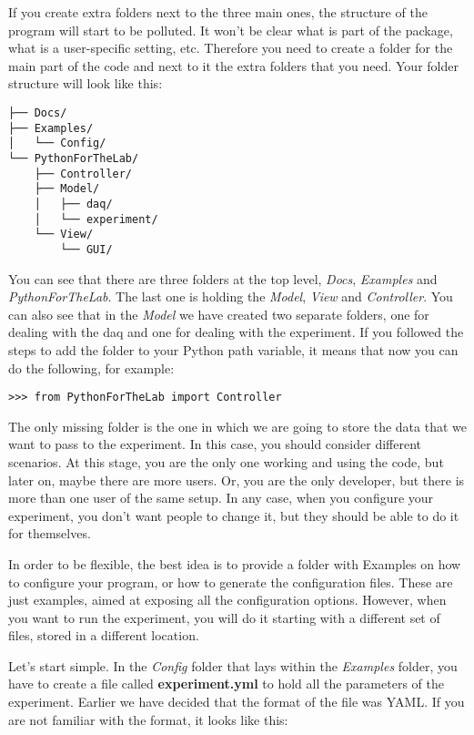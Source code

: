 If you create extra folders next to the three main ones, the structure
of the program will start to be polluted. It won't be clear what is part
of the package, what is a user-specific setting, etc. Therefore you need
to create a folder for the main part of the code and next to it the
extra folders that you need. Your folder structure will look like this:

\begin{verbatim}
├── Docs/
├── Examples/
│   └── Config/
└── PythonForTheLab/
    ├── Controller/
    ├── Model/
    │   ├── daq/
    │   └── experiment/
    └── View/
        └── GUI/
\end{verbatim}

You can see that there are three folders at the top level, \emph{Docs},
\emph{Examples} and \emph{PythonForTheLab}. The last one is holding the
\emph{Model}, \emph{View} and \emph{Controller}. You can also see that
in the \emph{Model} we have created two separate folders, one for
dealing with the daq and one for dealing with the experiment. If you
followed the steps to add the folder to your Python path variable, it
means that now you can do the following, for example:

\begin{verbatim}
>>> from PythonForTheLab import Controller
\end{verbatim}

The only missing folder is the one in which we are going to store the
data that we want to pass to the experiment. In this case, you should
consider different scenarios. At this stage, you are the only one
working and using the code, but later on, maybe there are more users.
Or, you are the only developer, but there is more than one user of the
same setup. In any case, when you configure your experiment, you don't
want people to change it, but they should be able to do it
for themselves.

In order to be flexible, the best idea is to provide a folder with
Examples on how to configure your program, or how to generate the
configuration files. These are just examples, aimed at exposing all the
configuration options. However, when you want to run the experiment, you
will do it starting with a different set of files, stored in a
different location.

Let's start simple. In the \emph{Config} folder that lays within the
\emph{Examples} folder, you have to create a file called
\textbf{experiment.yml} to hold all the parameters of the experiment.
Earlier we have decided that the format of the file was {YAML}. If you
are not familiar with the format, it looks like this:

